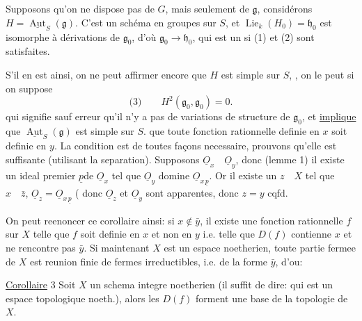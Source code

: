 
Supposons qu'on ne dispose pas de $G$, mais seulement de $\mathfrak g$, considérons $H=\underline{\operatorname{Aut}}_S(\mathfrak g)$.
 C'est un schéma en groupes sur $S$, et $\operatorname{Lie}_k(H_0)=\mathfrak h_0$ est isomorphe à    dérivations de $\mathfrak g_0$, d'où $\mathfrak g_0\to\mathfrak h_0$, qui est un  si (1) et (2) sont satisfaites.

S'il en est ainsi, on ne peut affirmer encore que $H$ est simple sur $S$, ,  on le peut si on suppose
\[
\text{(3)}\qquad H^2(\mathfrak g_0,\mathfrak g_0)=0.
\]
qui signifie sauf erreur qu'il n'y a pas de variations de structure   de $\mathfrak g_0$, et \uline{implique} que  $\underline{\operatorname{Aut}}_S(\mathfrak g)$ est simple sur $S$.
que toute fonction rationnelle definie en $x$ soit definie en $y$.  La condition est de toutes façons necessaire, prouvons qu'elle est suffisante (utilisant la separation). Supposons $\underline O_x\quad\underline O_y$, donc (lemme 1) il existe un ideal premier $\underline p$de $\underline O_x$ tel que $\underline O_y$ domine $\underline O_{x\,\underline p}$. Or il existe un $z\quad X$ tel que $x\quad\bar z$, $\underline O_z=\underline O_{x\,\underline p}$ (
donc $\underline O_z$ et $\underline O_y$ sont apparentes, donc $z=y$ cqfd.

On peut reenoncer ce corollaire ainsi: si $x\notin\bar y$, il existe une fonction rationnelle $f$ sur $X$ telle que $f$ soit definie en $x$ et non en $y$ i.e. telle que $D(f)$ contienne $x$ et ne rencontre pas $\bar y$. Si maintenant $X$ est un espace noetherien, toute partie fermee de $X$ est reunion finie de fermes irreductibles, i.e. de la forme $\bar y$, d'ou:

\uline{Corollaire} 3 Soit $X$ un schema integre noetherien (il suffit de dire: qui est un espace topologique noeth.), alors les $D(f)$ forment une base de la topologie de $X$.

